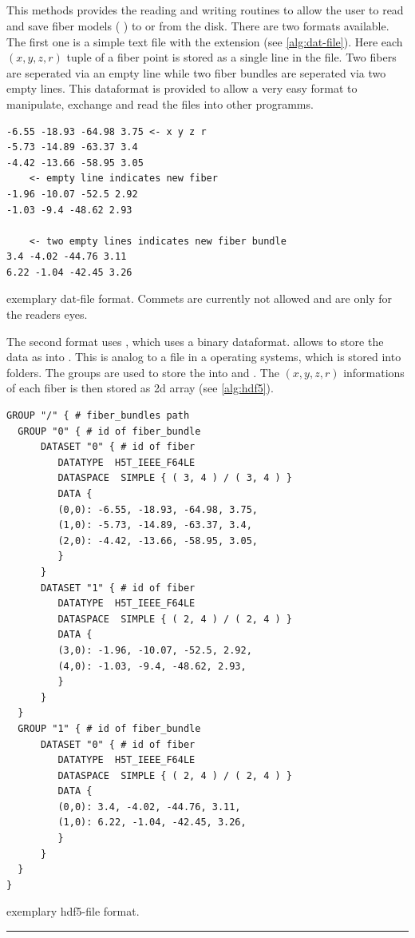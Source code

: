 \subsection{}
% 
This methods provides the reading and writing routines to allow the user to read and save fiber models (\ie{} ) to or from the disk.
There are two formats available.
The first one is a simple text file with the extension  (see \cref{alg:dat-file}).
Here each $(x,y,z,r)$ tuple of a fiber point is stored as a single line in the file.
Two fibers are seperated via an empty line while two fiber bundles are seperated via two empty lines.
This dataformat is provided to allow a very easy format to manipulate, exchange and read the files \eg{} into other programms.
% 
\begin{lstfloat}[!ht]
\begin{lstlisting}
-6.55 -18.93 -64.98 3.75 <- x y z r
-5.73 -14.89 -63.37 3.4
-4.42 -13.66 -58.95 3.05
    <- empty line indicates new fiber
-1.96 -10.07 -52.5 2.92
-1.03 -9.4 -48.62 2.93

    <- two empty lines indicates new fiber bundle
3.4 -4.02 -44.76 3.11
6.22 -1.04 -42.45 3.26
\end{lstlisting}
\caption{exemplary dat-file format. Commets are currently not allowed and are only for the readers eyes.}\label{alg:dat-file}
\end{lstfloat}
% 
% 
\par
The second format uses \hdf{} \cite{hdf5}, which uses a binary dataformat.
\hdf{} allows to store the data as  into .
This is analog to a file in a operating systems, which is stored into folders.
The \hdf{} groups are used to store the  into  and .
The $(x,y,z,r)$ informations of each fiber is then stored as 2d array (see \cref{alg:hdf5}). 
% 
\begin{lstfloat}[!ht]
\lstset{style=common}
\begin{lstlisting}
GROUP "/" { # fiber_bundles path
  GROUP "0" { # id of fiber_bundle
      DATASET "0" { # id of fiber
         DATATYPE  H5T_IEEE_F64LE
         DATASPACE  SIMPLE { ( 3, 4 ) / ( 3, 4 ) }
         DATA {
         (0,0): -6.55, -18.93, -64.98, 3.75,
         (1,0): -5.73, -14.89, -63.37, 3.4,
         (2,0): -4.42, -13.66, -58.95, 3.05,
         }
      }
      DATASET "1" { # id of fiber
         DATATYPE  H5T_IEEE_F64LE
         DATASPACE  SIMPLE { ( 2, 4 ) / ( 2, 4 ) }
         DATA {
         (3,0): -1.96, -10.07, -52.5, 2.92,
         (4,0): -1.03, -9.4, -48.62, 2.93,
         }
      }
  }
  GROUP "1" { # id of fiber_bundle
      DATASET "0" { # id of fiber
         DATATYPE  H5T_IEEE_F64LE
         DATASPACE  SIMPLE { ( 2, 4 ) / ( 2, 4 ) }
         DATA {
         (0,0): 3.4, -4.02, -44.76, 3.11,
         (1,0): 6.22, -1.04, -42.45, 3.26,
         }
      }
  }
}
\end{lstlisting}
\caption{exemplary hdf5-file format.} \label{alg:hdf5}
\end{lstfloat}
% 
% 
% 
\par
\noindent\rule{\textwidth}{2pt}
\newpage
% 
